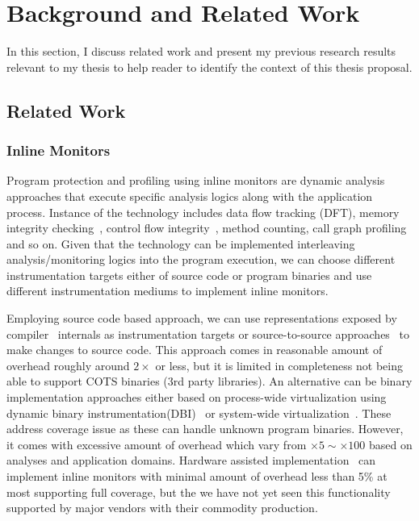 \section{Background and Related Work}
\label{sec:related}

In this section, I discuss related work and present my previous research
results relevant to my thesis to help reader to identify the context of this
thesis proposal.

\subsection{Related Work}

\subsubsection{Inline Monitors}
\label{ssec:inline}

Program protection and profiling using inline monitors are dynamic analysis
approaches that execute specific analysis logics along with the application
process. Instance of the technology includes data flow tracking (DFT), memory
integrity checking~\cite{memcheck, drmemory:cgo2011}, control flow
integrity~\cite{cfi}, method counting, call graph profiling and so on.  Given
that the technology can be implemented interleaving analysis/monitoring logics
into the program execution, we can choose different instrumentation targets
either of source code or program binaries and use different instrumentation
mediums to implement inline monitors.

Employing source code based approach, we can use representations exposed  by
compiler~\cite{llvm:cgo04} internals as instrumentation targets or
source-to-source approaches~\cite{txl, cil} to make changes to source code.
This approach comes in reasonable amount of overhead roughly around $2\times$
or less, but it is limited in completeness not being able to support COTS
binaries (\ie 3rd party libraries).  An alternative can be binary
implementation approaches either based on process-wide virtualization using
dynamic binary instrumentation(DBI)~\cite{pin:pldi2005, dynamorio, valgrind} or
system-wide virtualization~\cite{qemu:usenix05, xen:sosp2003}. These address
coverage issue as these can handle unknown program binaries. However, it comes
with excessive amount of overhead which vary from $\times 5 \sim \times 100$
based on analyses and application domains. Hardware assisted
implementation~\cite{raksha:isca2007, lba:isca2008} can implement inline
monitors with minimal amount of overhead less than 5\% at most supporting full
coverage, but the we have not yet seen this functionality supported by major
vendors with their commodity production.

